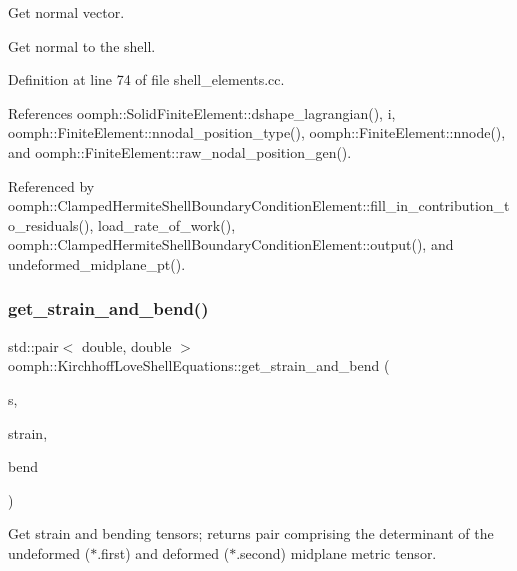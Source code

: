 Get normal vector. 

Get normal to the shell. 

Definition at line 74 of file shell\+\_\+elements.\+cc.



References oomph\+::\+Solid\+Finite\+Element\+::dshape\+\_\+lagrangian(), i, oomph\+::\+Finite\+Element\+::nnodal\+\_\+position\+\_\+type(), oomph\+::\+Finite\+Element\+::nnode(), and oomph\+::\+Finite\+Element\+::raw\+\_\+nodal\+\_\+position\+\_\+gen().



Referenced by oomph\+::\+Clamped\+Hermite\+Shell\+Boundary\+Condition\+Element\+::fill\+\_\+in\+\_\+contribution\+\_\+to\+\_\+residuals(), load\+\_\+rate\+\_\+of\+\_\+work(), oomph\+::\+Clamped\+Hermite\+Shell\+Boundary\+Condition\+Element\+::output(), and undeformed\+\_\+midplane\+\_\+pt().

\mbox{\label{classoomph_1_1KirchhoffLoveShellEquations_ad5a82826cad1b458c849e44114ea7d63}} 
\subsubsection{\texorpdfstring{get\+\_\+strain\+\_\+and\+\_\+bend()}{get\_strain\_and\_bend()}}
{\footnotesize\ttfamily std\+::pair$<$ double, double $>$ oomph\+::\+Kirchhoff\+Love\+Shell\+Equations\+::get\+\_\+strain\+\_\+and\+\_\+bend (\begin{DoxyParamCaption}\item[{const \hyperlink{classoomph_1_1Vector}{Vector}$<$ double $>$ \&}]{s,  }\item[{\hyperlink{classoomph_1_1DenseDoubleMatrix}{Dense\+Double\+Matrix} \&}]{strain,  }\item[{\hyperlink{classoomph_1_1DenseDoubleMatrix}{Dense\+Double\+Matrix} \&}]{bend }\end{DoxyParamCaption})}



Get strain and bending tensors; returns pair comprising the determinant of the undeformed ($\ast$.first) and deformed ($\ast$.second) midplane metric tensor. 

